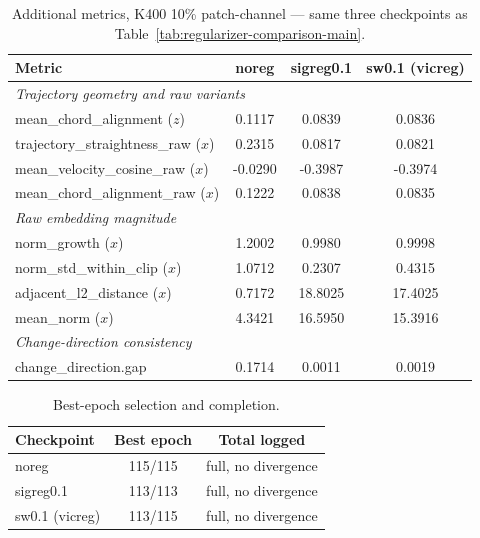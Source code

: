 \begin{table}[H]
\centering
\caption{Additional metrics, K400 10\% patch-channel --- same three checkpoints as
Table~\ref{tab:regularizer-comparison-main}.}
\label{tab:regularizer-comparison-additional}
\begin{tabular}{lccc}
\toprule
Metric & noreg & sigreg0.1 & sw0.1 (vicreg) \\
\midrule
\multicolumn{4}{l}{\textit{Trajectory geometry and raw variants}} \\
mean\_chord\_alignment ($z$) & 0.1117 & 0.0839 & 0.0836 \\
trajectory\_straightness\_raw ($x$) & 0.2315 & 0.0817 & 0.0821 \\
mean\_velocity\_cosine\_raw ($x$) & -0.0290 & -0.3987 & -0.3974 \\
mean\_chord\_alignment\_raw ($x$) & 0.1222 & 0.0838 & 0.0835 \\
\midrule
\multicolumn{4}{l}{\textit{Raw embedding magnitude}} \\
norm\_growth ($x$) & 1.2002 & 0.9980 & 0.9998 \\
norm\_std\_within\_clip ($x$) & 1.0712 & 0.2307 & 0.4315 \\
adjacent\_l2\_distance ($x$) & 0.7172 & 18.8025 & 17.4025 \\
mean\_norm ($x$) & 4.3421 & 16.5950 & 15.3916 \\
\midrule
\multicolumn{4}{l}{\textit{Change-direction consistency}} \\
change\_direction.gap & 0.1714 & 0.0011 & 0.0019 \\
\bottomrule
\end{tabular}
\end{table}

\begin{table}[H]
\centering
\caption{Best-epoch selection and completion.}
\label{tab:regularizer-comparison-stability}
\begin{tabular}{lcc}
\toprule
Checkpoint & Best epoch & Total logged \\
\midrule
noreg & 115/115 & full, no divergence \\
sigreg0.1 & 113/113 & full, no divergence \\
sw0.1 (vicreg) & 113/115 & full, no divergence \\
\bottomrule
\end{tabular}
\end{table}


